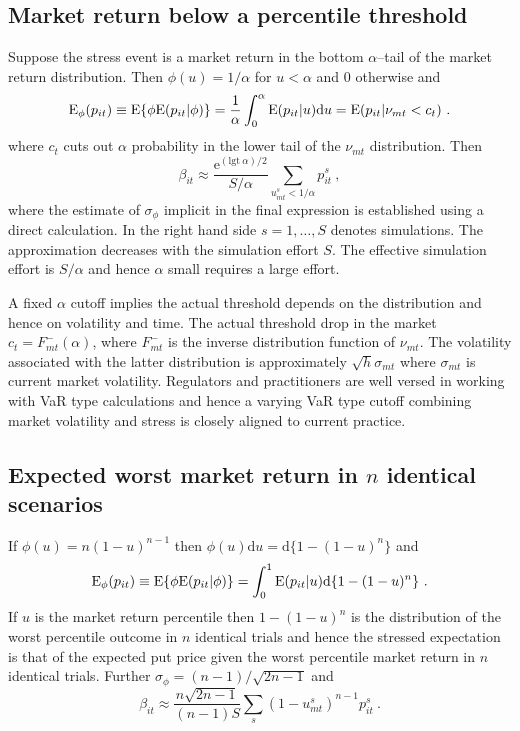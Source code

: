 \documentclass[authoryear]{elsarticle}
\newcommand{\logit}{\mathrm{lgt}}
\newcommand{\E}{\mathrm{E}}
\newcommand{\e}{\mathrm{e}}
\newcommand{\de}{\mathrm{d}}
\begin{document}
\subsection{Market return below a percentile threshold} 

Suppose the stress event is a market return in the bottom $\alpha$--tail of the  market return distribution.   Then  $\phi(u)=1/\alpha$ for $u< \alpha$ and 0  otherwise and
$$
\Es(p_{it}) \equiv \E\{\phi\E(p_{it}|\phi)\} = \frac{1}{\alpha}\int_0^\alpha\E(p_{it}|u)\de u = \E(p_{it}|\nu_{mt}<c_{t}) \ .
$$
where $c_t$ cuts out $\alpha$ probability in the lower tail of the $\nu_{mt}$ distribution.   Then
$$
\beta_{it} \approx  \frac{\e^{(\logit\ \alpha)/2}}{S/\alpha} \sum_{u^s_{mt}<1/\alpha}  p_{it}^s\ ,
$$
where the estimate of $\sigma_\phi$ implicit in the final expression is established using a direct calculation.  In the right hand side $s=1,\ldots,S$ denotes simulations.  The approximation decreases with the simulation effort $S$.   The effective simulation effort is $S/\alpha$ and hence $\alpha$ small requires a  large effort.

A fixed $\alpha$ cutoff  implies the actual threshold depends on the distribution and hence  on volatility and  time.  The actual threshold drop in the market $c_t=F_{mt}^-(\alpha)$, where $F_{mt}^-$ is the inverse distribution function of $\nu_{mt}$.  The volatility associated with the latter distribution is approximately $\sqrt{h}\sigma_{mt}$ where $\sigma_{mt}$ is current market volatility.   Regulators and practitioners  are well versed in working with VaR type calculations and hence a varying VaR type cutoff combining market volatility and stress is closely aligned to current practice. 


\subsection{Expected worst market return in $n$ identical scenarios} 
If $\phi(u)=n(1-u)^{n-1}$ then $\phi(u)\de u = \de\{1-(1-u)^n\}$ and 
$$
\Es(p_{it}) \equiv \E\{\phi\E(p_{it}|\phi)\} = \int_0^1\E(p_{it}|u)\de\{1-(1-u)^n\}\ .
$$
If $u$ is the market return percentile then  $1-(1-u)^n$ is the distribution of the worst percentile outcome in $n$ identical trials and hence the stressed expectation is that of the expected put price given the worst percentile market return in $n$ identical trials.  Further 
 $\sigma_\phi=(n-1)/\sqrt{2n-1}$ and 
$$
\beta_{it}  \approx \frac{n\sqrt{2n-1}}{(n-1)S} \sum_s (1-u^s_{mt})^{n-1}p_{it}^s \ . 
$$
\end{document}
